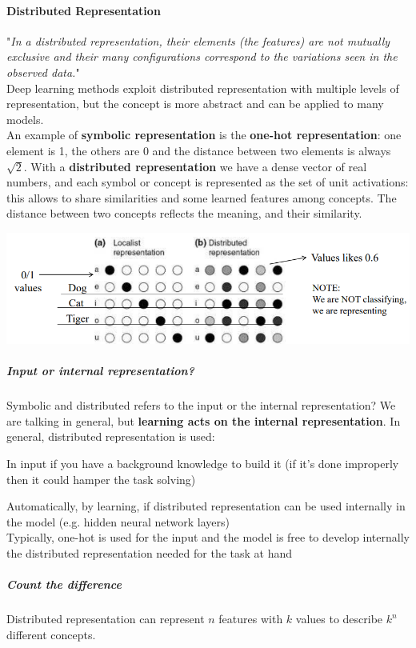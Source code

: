 \documentclass[10pt]{report}
\begin{document}
\paragraph{Distributed Representation} "\textit{In a distributed representation, their elements (the features) are not mutually exclusive and their many configurations correspond to the variations seen in the observed data.}"\\
Deep learning methods exploit distributed representation with multiple levels of representation, but the concept is more abstract and can be applied to many models.\\
An example of \textbf{symbolic representation} is the \textbf{one-hot representation}: one element is 1, the others are 0 and the distance between two elements is always $\sqrt{2}$. With a \textbf{distributed representation} we have a dense vector of real numbers, and each symbol or concept is represented as the set of unit activations: this allows to share similarities and some learned features among concepts. The distance between two concepts reflects the meaning, and their similarity.
\begin{center}
	\includegraphics[scale=0.75]{51.png}
\end{center}
\subparagraph{Input or internal representation?} Symbolic and distributed refers to the input or the internal representation? We are talking in general, but \textbf{learning acts on the internal representation}. In general, distributed representation is used:
\begin{list}{}{}
	\item In input if you have a background knowledge to build it (if it's done improperly then it could hamper the task solving)
	\item Automatically, by learning, if distributed representation can be used internally in the model (e.g. hidden neural network layers)\\
	Typically, one-hot is used for the input and the model is free to develop internally the distributed representation needed for the task at hand
\end{list}
\subparagraph{Count the difference} Distributed representation can represent $n$ features with $k$ values to describe $k^n$ different concepts.
\end{document}
